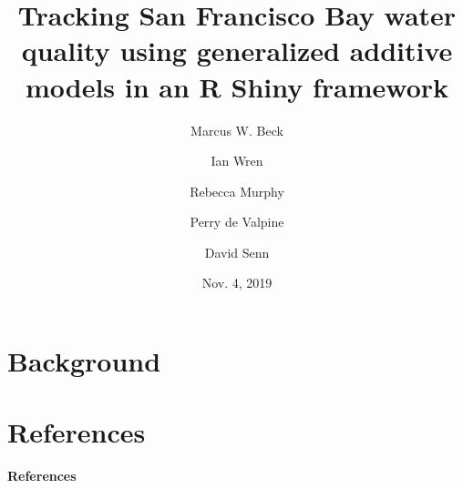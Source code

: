 \documentclass{beamer}
\begin{document}


\title[Tracking SF Bay Water Quality]{\textbf{Tracking San Francisco Bay water quality using generalized additive models in an R Shiny framework}}
\author[Beck et al.]{Marcus W. Beck \and Ian Wren \and Rebecca Murphy \and Perry de Valpine \and David Senn}


\date{Nov. 4, 2019}


\begin{frame}[shrink]
\vspace{0.2in}
\titlepage
\end{frame}

\section{Background}


\section{References}
\begin{frame}[t]{\textbf{References}}
% 
% 
\end{frame}
\end{document}
